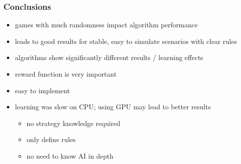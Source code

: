 \begin{frame}
    \frametitle{Conclusions}
    \begin{itemize}
        \item games with much randomness impact algorithm performance
        \item leads to good results for stable, easy to simulate scenarios with clear rules
        \item algorithms show significantly different results / learning effects
        \item reward function is very important
        \item easy to implement
        \item learning was slow on CPU; using GPU may lead to better results
        \begin{itemize}
            \item no strategy knowledge required
            \item only define rules
            \item no need to know AI in depth
        \end{itemize}
    \end{itemize}
\end{frame}
